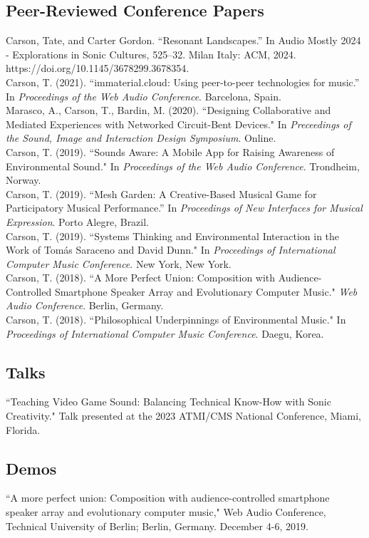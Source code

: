 \documentclass[10pt, a4paper]{article}
\newcommand{\years}[1]{\marginnote{\scriptsize #1}}
\begin{document}
\subsection*{Peer-Reviewed Conference Papers}
\years{2024} Carson, Tate, and Carter Gordon. “Resonant Landscapes.” In Audio Mostly 2024 - Explorations in Sonic Cultures, 525–32. Milan Italy: ACM, 2024. https://doi.org/10.1145/3678299.3678354.\\
\years{2021} Carson, T. (2021). ``immaterial.cloud: Using peer-to-peer technologies for music.'' In \textit{Proceedings of the Web Audio Conference}. Barcelona, Spain.\\ 
\years{2020} Marasco, A., Carson, T., Bardin, M. (2020). ``Designing Collaborative and Mediated Experiences with Networked Circuit-Bent Devices." In \textit{Preceedings of the Sound, Image and Interaction Design Symposium}. Online.\\
\years{2019} Carson, T. (2019). “Sounds Aware: A Mobile App for Raising Awareness of Environmental Sound." In \textit{Proceedings of the Web Audio Conference}. Trondheim, Norway.\\
 Carson, T. (2019). “Mesh Garden: A Creative-Based Musical Game for Participatory Musical Performance.” In \textit{Proceedings of New Interfaces for Musical Expression}. Porto Alegre, Brazil.\\
Carson, T. (2019). ``Systems Thinking and Environmental Interaction in the Work of Tomás Saraceno and David Dunn." In \textit{Proceedings of International Computer Music Conference}. New York, New York.\\
\years{2018} Carson, T. (2018). “A More Perfect Union: Composition with Audience-Controlled Smartphone Speaker Array and Evolutionary Computer Music." \textit{Web Audio Conference}. Berlin, Germany.\\
 Carson, T. (2018). “Philosophical Underpinnings of Environmental Music." In \textit{Proceedings of International Computer Music Conference}. Daegu, Korea.

\subsection*{Talks}
\years{2023} ``Teaching Video Game Sound: Balancing Technical Know-How with Sonic Creativity." Talk presented at the 2023 ATMI/CMS National Conference, Miami, Florida.


\subsection*{Demos}
\years{2019} ``A more perfect union: Composition with audience-controlled smartphone speaker array and evolutionary computer music," Web Audio Conference, Technical University of Berlin; Berlin, Germany. December 4-6, 2019.
\end{document}

